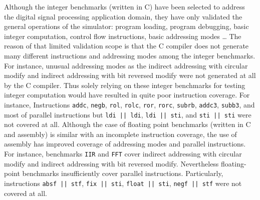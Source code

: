 Although the integer benchmarks (written in C) have been selected to address the digital signal processing application domain, they have only validated the general operations of the simulator: program loading, program debugging, basic integer computation, control flow instructions, basic addressing modes \ldots
The reason of that limited validation scope is that the C compiler does not generate many different instructions and addressing modes among the integer benchmarks.
For instance, unusual addressing modes as the indirect addressing with circular modify and indirect addressing with bit reversed modify were not generated at all by the C compiler. 
Thus solely relying on these integer benchmarks for testing integer computation would have resulted in quite poor instruction coverage.
For instance, Instructions \texttt{addc}, \texttt{negb}, \texttt{rol}, \texttt{rolc}, \texttt{ror}, \texttt{rorc}, \texttt{subrb}, \texttt{addc3}, \texttt{subb3}, and most of parallel instructions but \texttt{ldi || ldi}, \texttt{ldi || sti}, and \texttt{sti || sti} were not covered at all.
Although the case of floating point benchmarks (written in C and assembly) is similar with an incomplete instruction coverage, the use of assembly has improved coverage of addressing modes and parallel instructions.
For instance, benchmarks \texttt{IIR} and \texttt{FFT} cover indirect addressing with circular modify and indirect addressing with bit reversed modify.
Nevertheless floating-point benchmarks insufficiently cover parallel instructions.
Particularly, instructions \texttt{absf || stf}, \texttt{fix || sti}, \texttt{float || sti}, \texttt{negf || stf} were not covered at all.


